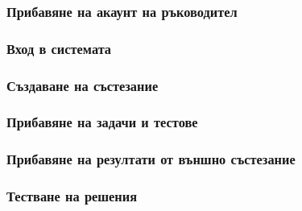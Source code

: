 \documentclass[a4paper,12pt]{article}
\begin{document}
  \subsubsection{Прибавяне на акаунт на ръководител}
  \subsubsection{Вход в системата}
  \subsubsection{Създаване на състезание}
  \subsubsection{Прибавяне на задачи и тестове}
  \subsubsection{Прибавяне на резултати от външно състезание}
  \subsubsection{Тестване на решения}
  
  \newpage
  
\end{document}
